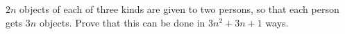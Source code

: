 $2n$ objects of each of three kinds are given to two persons, so that each person gets $3n$ objects. Prove that this can be done in $3n^2 + 3n + 1$ ways.
